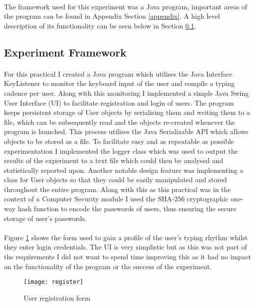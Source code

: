 \documentclass{article}
\begin{document}
\paragraph{}
The framework used for this experiment was a Java program, important areas of the program can be found in Appendix Section \ref{appendix}. A high level description of its functionality can be seen below in Section \ref{setup}. 

\subsection{Experiment Framework} \label{setup}
\paragraph{}
For this practical I created a Java program which utilises the Java Interface KeyListener to monitor the keyboard input of the user and compile a typing cadence per user. Along with this monitoring I implemented a simple Java Swing User Interface (UI) to facilitate registration and login of users. The program keeps persistent storage of User objects by serialising them and writing them to a file, which can be subsequently read and the objects re-created whenever the program is launched. This process utilises the Java Serializable API which allows objects to be stored as a file. To facilitate easy and as repeatable as possible experimentation I implemented the logger class which was used to output the results of the experiment to a text file which could then be analysed and statistically reported upon. Another notable design feature was implementing a class for User objects so that they could be easily manipulated and stored throughout the entire program. Along with this as this practical was in the context of a Computer Security module I used the SHA-256 cryptographic one-way hash function to encode the passwords of users, thus ensuring the secure storage of user's passwords.       
\paragraph{}
Figure \ref{fig:register} shows the form used to gain a profile of the user's typing rhythm whilst they enter login credentials. The UI is very simplistic but as this was not part of the requirements I did not want to spend time improving this as it had no impact on the functionality of the program or the success of the experiment. 

\begin{figure}[H]
    \centering
    \texttt{[image: register]}
    \caption{User registration form}
    \label{fig:register}
\end{figure}
\end{document}
